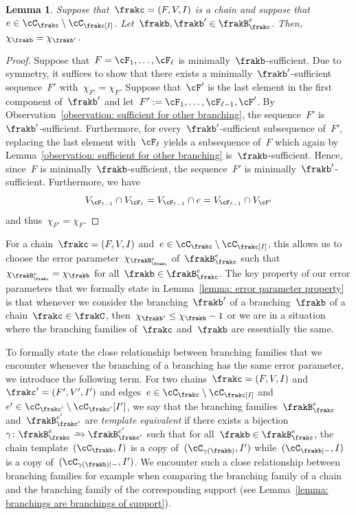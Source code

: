 \documentclass[11pt]{amsart}
\newcommand{\bijection}{\mathchoice
	{\xrightarrow{\smash{\raisebox{-3pt}{$\scriptstyle\sim$}}}}%
	{\xrightarrow{\smash{\raisebox{-3pt}{$\scriptstyle\sim$}}}}%
	{\xrightarrow{\smash{\raisebox{-2.5pt}{$\scriptscriptstyle\sim$}}}}%
	{\xrightarrow{\smash{\raisebox{-2.5pt}{$\scriptscriptstyle\sim$}}}}%
}
\newcommand{\om}{\mathord{-}}
\newtheorem{lemma}[algocf]{Lemma}
\theoremstyle{definition}
\numberwithin{equation}{section}
\begin{document}
	\begin{lemma}\label{lemma: same error parameter}
		Suppose that~$\frakc=(F,V,I)$ is a chain and suppose that~$e\in\cC_\frakc\setminus\cC_\frakc[I]$.
		Let~$\frakb,\frakb'\in\frakB_\frakc^e$.
		Then,~$\chi_{\frakb}=\chi_{\frakb'}$.
	\end{lemma}
	\begin{proof}
		Suppose that~$F=\cF_1,\ldots,\cF_\ell$ is minimally~$\frakb$-sufficient.
		Due to symmetry, it suffices to show that there exists a minimally~$\frakb'$-sufficient sequence~$F'$ with~$\chi_{F'}= \chi_F$.
		Suppose that~$\cF'$ is the last element in the first component of~$\frakb'$ and let~$F':=\cF_1,\ldots,\cF_{\ell-1},\cF'$.
		By Observation~\ref{observation: sufficient for other branching}, the sequence~$F'$ is~$\frakb'$-sufficient.
		Furthermore, for every~$\frakb'$-sufficient subsequence of~$F'$, replacing the last element with~$\cF_\ell$ yields a subsequence of~$F$ which again by Lemma~\ref{observation: sufficient for other branching} is~$\frakb$-sufficient.
		Hence, since~$F$ is minimally~$\frakb$-sufficient, the sequence~$F'$ is minimally~$\frakb'$-sufficient.
		Furthermore, we have
		\begin{equation*}
			V_{\cF_{\ell-1}}\cap V_{\cF_\ell}
			=V_{\cF_{\ell-1}}\cap e
			=V_{\cF_{\ell-1}}\cap V_{\cF'}
		\end{equation*}
		and thus~$\chi_{F'}= \chi_F$.
	\end{proof}
	For a chain~$\frakc=(F,V,I)$ and~$e\in\cC_\frakc\setminus\cC_\frakc[I]$, this allows us to choose the error parameter~$\chi_{\frakB_\frakc^e}$ of~$\frakB_\frakc^e$ such that~$\chi_{\frakB_\frakc^e}=\chi_\frakb$ for all~$\frakb\in\frakB_\frakc^e$.
	The key property of our error parameters that we formally state in Lemma~\ref{lemma: error parameter property} is that whenever we consider the branching~$\frakb'$ of a branching~$\frakb$ of a chain~$\frakc\in\frakC$, then~$\chi_{\frakb'}\leq\chi_\frakb-1$ or we are in a situation where the branching families of~$\frakc$ and~$\frakb$ are essentially the same.
	
	To formally state the close relationship between branching families that we encounter whenever the branching of a branching has the same error parameter, we introduce the following term.
	For two chains~$\frakc=(F,V,I)$ and~$\frakc'=(F',V',I')$ and edges~$e\in\cC_\frakc\setminus\cC_\frakc[I]$ and~$e'\in\cC_{\frakc'}\setminus\cC_{\frakc'}[I']$, we say that the branching families~$\frakB_\frakc^e$ and~$\frakB_{\frakc'}^{e'}$ are \emph{template equivalent} if there exists a bijection~$\gamma\colon \frakB_{\frakc}^e\bijection \frakB_{\frakc'}^{e'}$ such that for all~$\frakb\in\frakB_{\frakc}^e$, the chain template~$(\cC_{\frakb},I)$ is a copy of~$(\cC_{\gamma(\frakb)},I')$ while~$(\cC_{\frakb|\om},I)$ is a copy of~$(\cC_{\gamma(\frakb)|\om},I')$.
	We encounter such a close relationship between branching families for example when comparing the branching family of a chain and the branching family of the corresponding support (see Lemma~\ref{lemma: branchings are branchings of support}).
	
\end{document}
